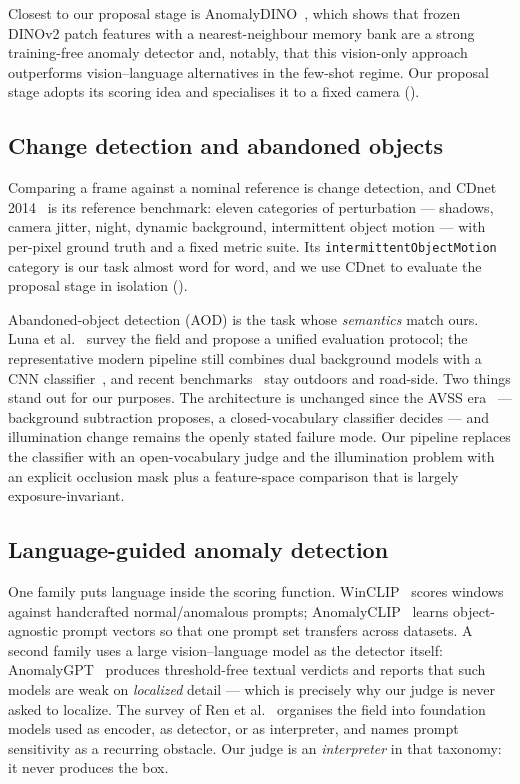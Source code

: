 Closest to our proposal stage is AnomalyDINO~\cite{Damm_2025}, which shows that
frozen DINOv2 patch features with a nearest-neighbour memory bank are a
strong training-free anomaly detector and, notably, that this vision-only
approach outperforms vision--language alternatives in the few-shot regime. Our
proposal stage adopts its scoring idea and specialises it to a fixed camera
().

\subsection{Change detection and abandoned objects}
\label{sec:related:aod}

Comparing a frame against a nominal reference is change detection, and CDnet
2014~\cite{Wang_2014} is its reference benchmark: eleven categories of
perturbation --- shadows, camera jitter, night, dynamic background,
intermittent object motion --- with per-pixel ground truth and a fixed metric
suite. Its \texttt{intermittentObjectMotion} category is our task almost word
for word, and we use CDnet to evaluate the proposal stage in isolation
().

Abandoned-object detection (AOD) is the task whose \emph{semantics} match ours.
Luna et al.~\cite{Luna_2018} survey the field and propose a unified evaluation
protocol; the representative modern pipeline still combines dual background
models with a CNN classifier~\cite{Park_2020,Park_2019}, and recent
benchmarks~\cite{Xu_2024} stay outdoors and road-side. Two things stand out for
our purposes. The architecture is unchanged since the AVSS
era~\cite{Miguel_2008} --- background subtraction proposes, a closed-vocabulary
classifier decides --- and illumination change remains the openly stated
failure mode. Our pipeline replaces the classifier with an open-vocabulary
judge and the illumination problem with an explicit occlusion mask plus a
feature-space comparison that is largely exposure-invariant.

\subsection{Language-guided anomaly detection}
\label{sec:related:lvlm}

One family puts language inside the scoring function.
WinCLIP~\cite{Jeong_2023} scores windows against handcrafted normal/anomalous
prompts; AnomalyCLIP~\cite{Zhou_2023} learns object-agnostic prompt vectors so
that one prompt set transfers across datasets. A second family uses a large
vision--language model as the detector itself: AnomalyGPT~\cite{Gu_2024}
produces threshold-free textual verdicts and reports that such models are weak
on \emph{localized} detail --- which is precisely why our judge is never asked
to localize. The survey of Ren et al.~\cite{Ren_2025} organises the field into
foundation models used as encoder, as detector, or as interpreter, and names
prompt sensitivity as a recurring obstacle. Our judge is an
\emph{interpreter} in that taxonomy: it never produces the box.

